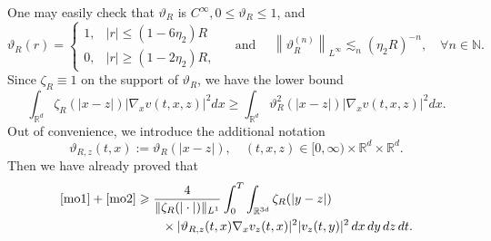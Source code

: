 \documentclass[reqno,11pt]{amsart}
\theoremstyle{plain}
\theoremstyle{definition}
\numberwithin{equation}{section}
\numberwithin{theorem}{section}
\def\geq{\geqslant}
\def\leq{\leqslant}
\def\R{\mathbb{R}}
\begin{document}
One  may easily check that $\vartheta_{R}$ is $C^{\infty}, 0 \leq \vartheta_{R} \leq 1$, and
\[
\vartheta_{R}(r)=\left\{\begin{array}{ll}
1, & |r| \leq\left(1-6 \eta_{2}\right) R \\
0, & |r| \geq\left(1-2 \eta_{2}\right) R,
\end{array} \quad \text { and } \quad\left\|\vartheta_{R}^{(n)}\right\|_{L^{\infty}} \lesssim_{n}\left(\eta_{2} R\right)^{-n}, \quad \forall n \in \mathbb{N}.\right.
\]
Since $\zeta_{R} \equiv 1$ on the support of $\vartheta_{R}$, we have the lower bound
\begin{equation*}
\int_{\mathbb{R}^{d}} \zeta_{R}\left(\left| x-z\right|\right)\left|\nabla_{x} v(t, x, z)\right|^{2} d x \geq \int_{\mathbb{R}^{d}} \vartheta_{R}^{2}\left(\left|x-z\right|\right)\left|\nabla_{x} v(t, x, z)\right|^{2} d x. 
\end{equation*}
Out of convenience, we introduce the additional notation
\begin{equation*}
\vartheta_{R, z}(t, x):=\vartheta_{R}\left(\left| x-z\right|\right), \quad(t, x, z) \in[0, \infty) \times \mathbb{R}^{d} \times \mathbb{R}^{d}. 
\end{equation*} Then we have already proved that
\begin{align}\label{F-est4}
 \eqref{mo1}+\eqref{mo2}
 &\geq\frac{4}{\|\zeta_R(|\cdot|)\|_{L^1}}
   \int_0^T\int_{\R^{3d}}\zeta_R(|y-z|)\notag\\
 &\qquad\times|\vartheta_{R,z}(t,x)\nabla_xv_z(t,x)|^2
           |v_z(t,y)|^2\,dx\,dy\,dz\,dt.
\end{align}
\end{document}
